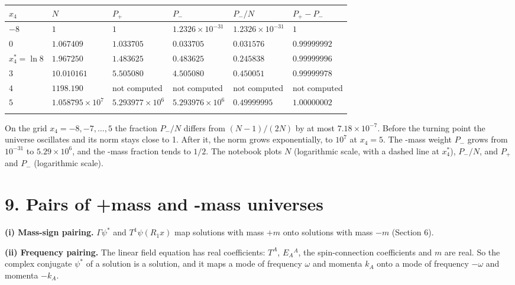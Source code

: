 \documentclass[10pt]{article}
\begin{document}
{\small\begin{longtable}{>{\raggedright\arraybackslash}p{}>{\raggedright\arraybackslash}p{}>{\raggedright\arraybackslash}p{}>{\raggedright\arraybackslash}p{}>{\raggedright\arraybackslash}p{}>{\raggedright\arraybackslash}p{}}\toprule
$x_4$ & $N$ & $P_+$ & $P_-$ & $P_-/N$ & $P_+ - P_-$ \\\midrule\endhead
\bottomrule\endfoot
$-8$ & $1$ & $1$ & $1.2326\times10^{-31}$ & $1.2326\times10^{-31}$ & $1$ \\*
$0$ & $1.067409$ & $1.033705$ & $0.033705$ & $0.031576$ & $0.99999992$ \\*
$x_4^* = \ln 8$ & $1.967250$ & $1.483625$ & $0.483625$ & $0.245838$ & $0.99999996$ \\*
$3$ & $10.010161$ & $5.505080$ & $4.505080$ & $0.450051$ & $0.99999978$ \\*
$4$ & $1198.190$ & not computed & not computed & not computed & not computed \\*
$5$ & $1.058795\times10^{7}$ & $5.293977\times10^{6}$ & $5.293976\times10^{6}$ & $0.49999995$ & $1.00000002$ \\*
\end{longtable}}

On the grid $x_4 = -8, -7, \dots, 5$ the fraction $P_-/N$ differs from $(N - 1)/(2N)$ by at most $7.18\times10^{-7}$. Before the turning point the universe oscillates and its norm stays close to 1. After it, the norm grows exponentially, to $10^7$ at $x_4 = 5$. The -mass weight $P_-$ grows from $10^{-31}$ to $5.29\times10^6$, and the -mass fraction tends to $1/2$. The notebook plots $N$ (logarithmic scale, with a dashed line at $x_4^*$), $P_-/N$, and $P_+$ and $P_-$ (logarithmic scale).


\section*{9. Pairs of +mass and -mass universes}

\textbf{(i) Mass-sign pairing.} $\Gamma\psi^*$ and $T^1\psi(R_1x)$ map solutions with mass $+m$ onto solutions with mass $-m$ (Section 6).


\textbf{(ii) Frequency pairing.} The linear field equation has real coefficients: $T^A$, $E_A{}^A$, the spin-connection coefficients and $m$ are real. So the complex conjugate $\psi^*$ of a solution is a solution, and it maps a mode of frequency $\omega$ and momenta $k_A$ onto a mode of frequency $-\omega$ and momenta $-k_A$.
\end{document}
